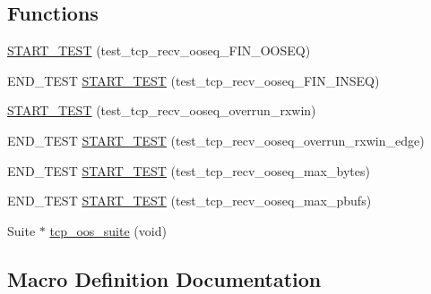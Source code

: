 \subsection*{Functions}
\begin{DoxyCompactItemize}
\item 
\hyperlink{openmote-cc2538_2lwip_2test_2unit_2tcp_2test__tcp__oos_8c_a06e57221ae3e212e0ce776587a9fc062}{S\+T\+A\+R\+T\+\_\+\+T\+E\+ST} (test\+\_\+tcp\+\_\+recv\+\_\+ooseq\+\_\+\+F\+I\+N\+\_\+\+O\+O\+S\+EQ)
\item 
E\+N\+D\+\_\+\+T\+E\+ST \hyperlink{openmote-cc2538_2lwip_2test_2unit_2tcp_2test__tcp__oos_8c_a2b7dd8bafcdb6590e1594a1cc1888173}{S\+T\+A\+R\+T\+\_\+\+T\+E\+ST} (test\+\_\+tcp\+\_\+recv\+\_\+ooseq\+\_\+\+F\+I\+N\+\_\+\+I\+N\+S\+EQ)
\item 
\hyperlink{openmote-cc2538_2lwip_2test_2unit_2tcp_2test__tcp__oos_8c_a3bdbf082f49839e7207ed367d43e7718}{S\+T\+A\+R\+T\+\_\+\+T\+E\+ST} (test\+\_\+tcp\+\_\+recv\+\_\+ooseq\+\_\+overrun\+\_\+rxwin)
\item 
E\+N\+D\+\_\+\+T\+E\+ST \hyperlink{openmote-cc2538_2lwip_2test_2unit_2tcp_2test__tcp__oos_8c_aafe387da6189d23bbf9ba10d4c8bb8d3}{S\+T\+A\+R\+T\+\_\+\+T\+E\+ST} (test\+\_\+tcp\+\_\+recv\+\_\+ooseq\+\_\+overrun\+\_\+rxwin\+\_\+edge)
\item 
E\+N\+D\+\_\+\+T\+E\+ST \hyperlink{openmote-cc2538_2lwip_2test_2unit_2tcp_2test__tcp__oos_8c_ad9b53f1ac40809052a27d9cdc8b8d1bc}{S\+T\+A\+R\+T\+\_\+\+T\+E\+ST} (test\+\_\+tcp\+\_\+recv\+\_\+ooseq\+\_\+max\+\_\+bytes)
\item 
E\+N\+D\+\_\+\+T\+E\+ST \hyperlink{openmote-cc2538_2lwip_2test_2unit_2tcp_2test__tcp__oos_8c_a14ff6e06674d1c9570a28e23a2421ad5}{S\+T\+A\+R\+T\+\_\+\+T\+E\+ST} (test\+\_\+tcp\+\_\+recv\+\_\+ooseq\+\_\+max\+\_\+pbufs)
\item 
Suite $\ast$ \hyperlink{openmote-cc2538_2lwip_2test_2unit_2tcp_2test__tcp__oos_8c_a6c32e1a11e954785c70eff2c1f6a77b4}{tcp\+\_\+oos\+\_\+suite} (void)
\end{DoxyCompactItemize}


\subsection{Macro Definition Documentation}
\mbox{\label{openmote-cc2538_2lwip_2test_2unit_2tcp_2test__tcp__oos_8c_a1b222cdb2028d5a8d00999755f5a67f0}} 
